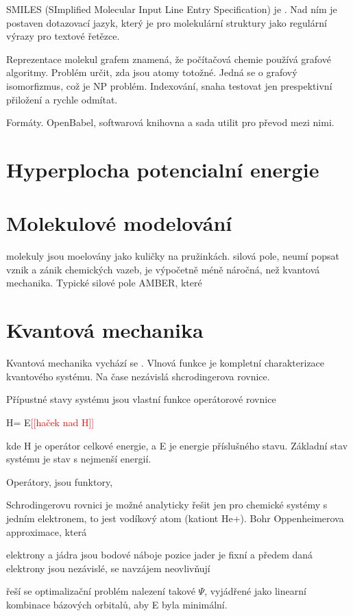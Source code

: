 \documentclass[10pt,draft,oneside]{fithesis2}
\newcommand\fixme[1]{\textcolor{red}{[[#1]]}}
\begin{document}
SMILES (SImplified Molecular Input Line Entry Specification) je . Nad ním je postaven dotazovací jazyk, který je pro molekulární struktury jako regulární výrazy pro textové řetězce.



Reprezentace molekul grafem znamená, že počítačová chemie používá grafové algoritmy. Problém určit, zda jsou atomy totožné. Jedná se o grafový isomorfizmus, což je NP problém. Indexování, snaha testovat jen prespektivní přiložení a rychle odmítat.

Formáty. OpenBabel, softwarová knihovna a sada utilit pro převod mezi nimi.

\section{Hyperplocha potencialní energie}



\section{Molekulové modelování}

molekuly jsou moelovány jako kuličky na pružinkách. silová pole, neumí popsat vznik a zánik chemických vazeb, je výpočetně méně náročná, než kvantová mechanika. Typické silové pole AMBER, které

\section{Kvantová mechanika}
Kvantová mechanika vychází se . Vlnová funkce je kompletní charakterizace kvantového systému. Na čase nezávislá shcrodingerova rovnice.

Přípustné stavy systému jsou vlastní funkce \Psi operátorové rovnice

H\Psi = E\Psi \fixme{haček nad H}

kde H je operátor celkové energie, a E je energie příslušného stavu. Základní stav systému je stav s nejmenší energií.

Operátory, jsou funktory, 

Schrodingerovu rovnici je možné analyticky řešit jen pro chemické systémy s jedním elektronem, to jest vodíkový atom (kationt He+). Bohr Oppenheimerova approximace, která

elektrony a jádra jsou bodové náboje
pozice jader je fixní a předem daná
elektrony jsou nezávislé, se navzájem neovlivňují

řeší se optimalizační problém nalezení takové \(\Psi\), vyjádřené jako linearní kombinace bázových orbitalů, aby E byla minimální.
\end{document}
